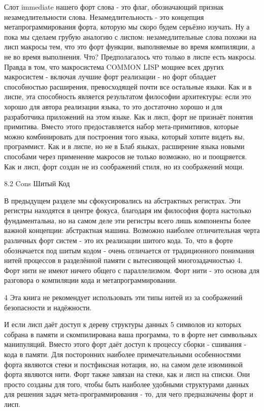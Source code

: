 Слот immediate нашего форт слова - это флаг, обозначающий признак незамедлительности слова. Незамедлительность - это концепция метапрограммирования форта, которую мы скоро будем серьёзно изучать. Ну а пока мы сделаем грубую аналогию с лиспом: незамедлительные слова похожи на лисп макросы тем, что это форт функции, выполняемые во время компиляции, а не во время выполнения. Что? Предполагалось что только в лиспе есть макросы. Правда в том, что макросистема COMMON LISP мощнее всех других макросистем - включая лучшие форт реализации - но форт обладает способностью расширения, превосходящей почти все остальные языки. Как и в лиспе, эта способность является результатом философии архитектуры: если это хорошо для автора реализации языка, то это достаточно хорошо и для разработчика приложений на этом языке. Как и лисп, форт не признаёт понятия примитива. Вместо этого предоставляется набор мета-примитивов, которые можно комбинировать для построения того языка, который хотите видеть вы, программист. Как и в лиспе, но не в Блаб языках, расширение языка новыми способами через применение макросов не только возможно, но и поощряется. Как и лисп, форт создан не из соображений стиля, но из соображений мощи.

8.2 Cons Шитый Код

В предыдущем разделе мы сфокусировались на абстрактных регистрах. Эти регистры находятся в центре фокуса, благодаря им философия форта настолько фундаментальна, но на самом деле эти регистры всего лишь компоненты более важной концепции: абстрактная машина. Возможно наиболее отличительная черта различных форт систем - это их реализации шитого кода. То, что в форте обозначается под шитым кодом - очень отличается от традиционного понимания нитей процессов в разделённой памяти с вытесняющей многозадачностью 4. Форт нити не имеют ничего общего с параллелизмом. Форт нити - это основа для разговора о компиляции кода и метапрограммировании.

4 Эта книга не рекомендует использовать эти типы нитей  из за соображений безопасности и надёжности.

И если лисп даёт доступ к дереву структуры данных 5 символов из которых собрана в памяти и скомпилирована ваша программа, то в форте нет символьных манипуляций. Вместо этого форт даёт доступ к процессу сборки - сшивания - кода в памяти. Для посторонних наиболее примечательными особенностями форта являются стеки и постфиксная нотация, но, на самом деле изюминкой форта являются нити. Форт также завязан на стеки, как и лисп на списки. Они просто созданы для того, чтобы быть наиболее удобными структурами данных для решения задач мета-программирования - то, для чего предназначены форт и лисп.

